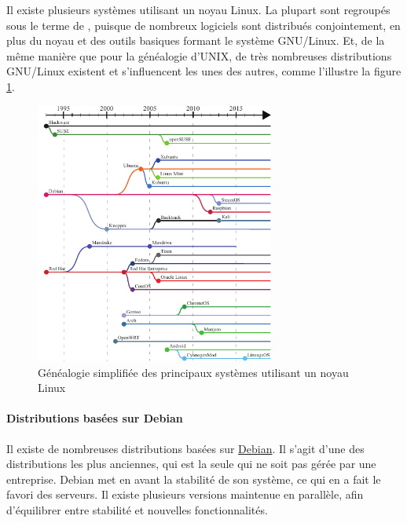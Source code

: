 Il existe plusieurs systèmes utilisant un noyau Linux. La plupart sont regroupés sous le terme de , puisque de nombreux logiciels sont distribués conjointement, en plus du noyau et des outils basiques formant le système GNU/Linux. Et, de la même manière que pour la généalogie d'UNIX, de très nombreuses distributions GNU/Linux existent et s'influencent les unes des autres, comme l'illustre la figure \ref{fig:distrib}.
\vspace{-2mm}
\begin{figure}[hb!]
\includegraphics[width=0.70\textwidth]{res/linux_distrib_genealogy_links.pdf}
\centering
\vspace{-1mm}\caption{Généalogie simplifiée des principaux systèmes utilisant un noyau Linux}\label{fig:distrib}
\vspace{-\baselineskip}
\end{figure}

\newpage

\paragraph{Distributions basées sur Debian}

Il existe de nombreuses distributions basées sur \href{https://www.debian.org}{Debian}. Il s'agit d'une des distributions les plus anciennes, qui est la seule qui ne soit pas gérée par une entreprise. Debian met en avant la stabilité de son système, ce qui en a fait le favori des serveurs. Il existe plusieurs versions maintenue en parallèle, afin d'équilibrer entre stabilité et nouvelles fonctionnalités.

